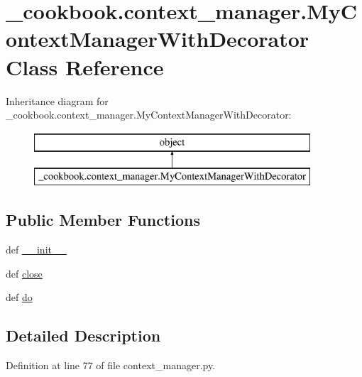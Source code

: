 \hypertarget{class__cookbook_1_1context__manager_1_1MyContextManagerWithDecorator}{\section{\-\_\-cookbook.\-context\-\_\-manager.\-My\-Context\-Manager\-With\-Decorator Class Reference}
\label{class__cookbook_1_1context__manager_1_1MyContextManagerWithDecorator}
}
Inheritance diagram for \-\_\-cookbook.\-context\-\_\-manager.\-My\-Context\-Manager\-With\-Decorator\-:\begin{figure}[H]
\begin{center}
\leavevmode
\includegraphics[height=2.000000cm]{d0/de7/class__cookbook_1_1context__manager_1_1MyContextManagerWithDecorator}
\end{center}
\end{figure}
\subsection*{Public Member Functions}
\begin{DoxyCompactItemize}
\item 
def \hyperlink{class__cookbook_1_1context__manager_1_1MyContextManagerWithDecorator_a0a4da720469cda83e496fc9803d3664e}{\-\_\-\-\_\-init\-\_\-\-\_\-}
\item 
def \hyperlink{class__cookbook_1_1context__manager_1_1MyContextManagerWithDecorator_a5434d93ea16adbacd9934eef6073963c}{close}
\item 
def \hyperlink{class__cookbook_1_1context__manager_1_1MyContextManagerWithDecorator_a8b22456b4212e6c458404aff36c68358}{do}
\end{DoxyCompactItemize}


\subsection{Detailed Description}


Definition at line 77 of file context\-\_\-manager.\-py.



